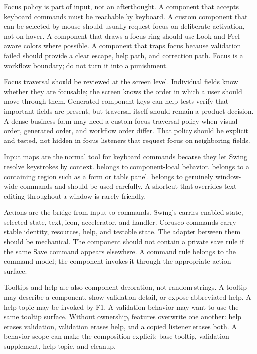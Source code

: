 Focus policy is part of input, not an afterthought. A component that accepts keyboard commands must be reachable by keyboard. A custom component that can be selected by mouse should usually request focus on deliberate activation, not on hover. A component that draws a focus ring should use Look-and-Feel-aware colors where possible. A component that traps focus because validation failed should provide a clear escape, help path, and correction path. Focus is a workflow boundary; do not turn it into a punishment.

Focus traversal should be reviewed at the screen level. Individual fields know whether they are focusable; the screen knows the order in which a user should move through them. Generated component keys can help tests verify that important fields are present, but traversal itself should remain a product decision. A dense business form may need a custom focus traversal policy when visual order, generated order, and workflow order differ. That policy should be explicit and tested, not hidden in focus listeners that request focus on neighboring fields.

Input maps are the normal tool for keyboard commands because they let Swing resolve keystrokes by context.  belongs to component-local behavior.  belongs to a containing region such as a form or table panel.  belongs to genuinely window-wide commands and should be used carefully. A shortcut that overrides text editing throughout a window is rarely friendly.

Actions are the bridge from input to commands. Swing's  carries enabled state, selected state, text, icon, accelerator, and handler. Corusco commands carry stable identity, resources, help, and testable state. The adapter between them should be mechanical. The component should not contain a private save rule if the same Save command appears elsewhere. A command rule belongs to the command model; the component invokes it through the appropriate action surface.

Tooltips and help are also component decoration, not random strings. A tooltip may describe a component, show validation detail, or expose abbreviated help. A help topic may be invoked by F1. A validation behavior may want to use the same tooltip surface. Without ownership, features overwrite one another: help erases validation, validation erases help, and a copied listener erases both. A behavior scope can make the composition explicit: base tooltip, validation supplement, help topic, and cleanup.

